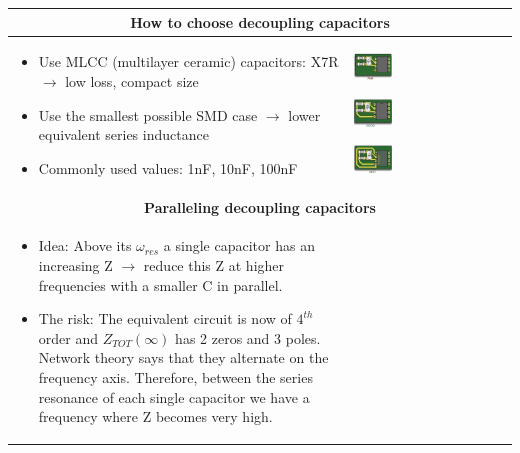 		\begin{table}[h!]
		\centering
		\begin{tabular}{|m{}|m{}|}
				\multicolumn{2}{c}{\textbf{How to choose decoupling capacitors}}
			\\
			\hline
				\begin{itemize}
					\item Use MLCC (multilayer ceramic) capacitors: X7R $\rightarrow$ low loss, compact size
					\item Use the smallest possible SMD case $\rightarrow$ lower equivalent series inductance
					\item Commonly used values: 1nF, 10nF, 100nF
				\end{itemize}
			& 
				\begin{center}\includegraphics[width=0.25\textwidth]{images/Oszi1.png}\end{center}  
				\begin{center}\includegraphics[width=0.25\textwidth]{images/Oszi2.png}\end{center} 
				\begin{center}\includegraphics[width=0.25\textwidth]{images/Oszi3.png}\end{center}   
			\\	
			\hline
				\multicolumn{2}{c}{\textbf{Paralleling decoupling capacitors}}
			\\
			\hline
				\begin{itemize}
					\item Idea: Above its $\omega_{res}$ a single capacitor has an increasing Z $\rightarrow$ reduce this Z at higher frequencies with a smaller C in parallel. 
					\item The risk: The equivalent circuit is now of $4^{th}$ order and $Z_{TOT}(\infty)$ has 2 zeros and 3 poles. Network theory says that they alternate on the frequency axis. Therefore, between the series resonance of each single capacitor we have a frequency where Z becomes very high. 
				\end{itemize}
			& 
	

			\\	
			\hline
			\end{tabular}
		\end{table}	